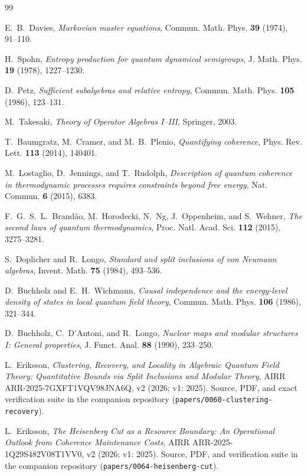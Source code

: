 \documentclass[11pt,a4paper]{article}
\theoremstyle{plain}
\theoremstyle{definition}
\theoremstyle{remark}
\begin{document}
\begin{thebibliography}{99}

 E.~B.~Davies, \emph{Markovian master equations}, Commun.
Math. Phys. \textbf{39} (1974), 91--110.

 H.~Spohn, \emph{Entropy production for quantum dynamical
semigroups}, J. Math. Phys. \textbf{19} (1978), 1227--1230.

 D.~Petz, \emph{Sufficient subalgebras and relative entropy},
Commun. Math. Phys. \textbf{105} (1986), 123--131.

 M.~Takesaki, \emph{Theory of Operator Algebras I--III},
Springer, 2003.

 T.~Baumgratz, M.~Cramer, and M.~B.~Plenio, \emph{Quantifying
coherence}, Phys. Rev. Lett. \textbf{113} (2014), 140401.

 M.~Lostaglio, D.~Jennings, and T.~Rudolph, \emph{Description of
quantum coherence in thermodynamic processes requires constraints beyond free
energy}, Nat. Commun. \textbf{6} (2015), 6383.

 F.~G.~S.~L.~Brand\~ao, M.~Horodecki, N.~Ng, J.~Oppenheim,
and S.~Wehner, \emph{The second laws of quantum thermodynamics}, Proc. Natl.
Acad. Sci. \textbf{112} (2015), 3275--3281.

 S.~Doplicher and R.~Longo, \emph{Standard and split
inclusions of von Neumann algebras}, Invent. Math. \textbf{75} (1984),
493--536.

 D.~Buchholz and E.~H.~Wichmann, \emph{Causal independence and
the energy-level density of states in local quantum field theory}, Commun.
Math. Phys. \textbf{106} (1986), 321--344.

 D.~Buchholz, C.~D'Antoni, and R.~Longo, \emph{Nuclear maps and
modular structures I: General properties}, J. Funct. Anal. \textbf{88} (1990),
233--250.

 L.~Eriksson, \emph{Clustering, Recovery, and Locality in
Algebraic Quantum Field Theory: Quantitative Bounds via Split Inclusions and
Modular Theory}, AIRR ARR-2025-7GXFT1VQV98JNA6Q, v2 (2026; v1: 2025). Source, PDF, and
exact verification suite in the companion repository
(\texttt{papers/0060-clustering-recovery}).

 L.~Eriksson, \emph{The Heisenberg Cut as a Resource Boundary: An
Operational Outlook from Coherence Maintenance Costs}, AIRR ARR-2025-1Q29S482V08T1VV0, v2
(2026; v1: 2025). Source, PDF, and verification suite in the companion
repository (\texttt{papers/0064-heisenberg-cut}).

\end{thebibliography}
\end{document}
